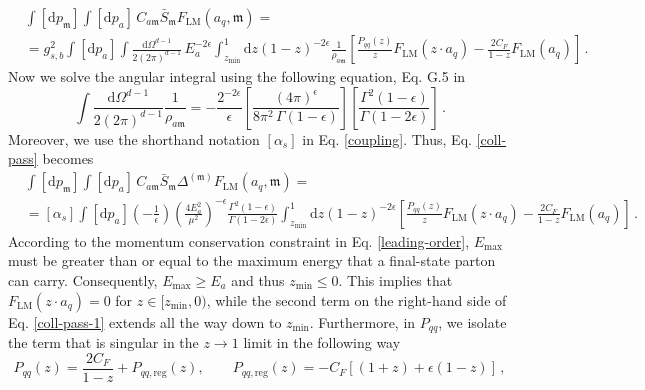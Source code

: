 \documentclass[a4paper, 12pt]{book}
\newcommand{\um}{\mathfrak{m}}
\begin{document}
\begin{equation}
  \begin{split}
  & \int [\mathrm{d}p_\um]\int[\mathrm{d}p_a] \, C_{a\um} \bar{S}_\um F_{\mathrm{LM}} (a_q, \um) = \\
  & = g^2_{s,b} \int[\mathrm{d}p_a] \int \frac{\mathrm{d}\Omega ^{d-1}}{2 (2\pi)^{d-1}} \, E_a^{-2\epsilon} \int_{z_{\mathrm{min}}}^{1} \mathrm{d}z (1-z)^{-2\epsilon} \frac{1}{ \rho_{a \um}} \left[\frac{P_{qq}(z)}{z} F_{\mathrm{LM}}(z \cdot a_q) - \frac{2 C_F}{1-z}F_{\mathrm{LM}} (a_q) \right] \, .
  \label{coll-pass}
  \end{split}
\end{equation}
Now we solve the angular integral using the following equation, Eq. G.5 in \cite{Asteriadis:1910}
\begin{equation}
  \int \frac{\mathrm{d}\Omega ^{d-1}}{2 (2\pi)^{d-1}} \frac{1}{\rho_{a \um}}= -\frac{2^{-2\epsilon}}{\epsilon} \left[ \frac{(4\pi)^{\epsilon}}{8\pi^2 \, \Gamma(1-\epsilon)}\right] \left[\frac{\Gamma^2(1-\epsilon)}{\Gamma(1-2\epsilon)} \right] \, .
\end{equation}
Moreover, we use the shorthand notation $[\alpha_s]$ in Eq. \ref{coupling}. Thus, Eq. \ref{coll-pass} becomes
\begin{equation}
  \begin{split}
  & \int [\mathrm{d}p_\um]\int[\mathrm{d}p_a] \, C_{a\um} \bar{S}_\um \Delta^{(\um)} F_{\mathrm{LM}} (a_q, \um) = \\
  & = [\alpha_s] \int[\mathrm{d}p_a] \left(-\frac{1}{\epsilon}\right) \left(\frac{4E_a^2}{\mu^2}\right)^{-\epsilon} \frac{\Gamma^2(1-\epsilon)}{\Gamma(1-2\epsilon)} \int_{z_{\mathrm{min}}}^{1} \mathrm{d}z (1-z)^{-2\epsilon} \left[ \frac{P_{qq}(z)}{z} F_{\mathrm{LM}}(z \cdot a_q) - \frac{2 C_F}{1-z}F_{\mathrm{LM}} (a_q) \right] \,.
  \label{coll-pass-1}
  \end{split}
\end{equation}
According to the momentum conservation constraint in Eq. \ref{leading-order}, $E_{\max}$ must be greater than or equal to the maximum energy that a final-state parton can carry. Consequently, $E_{\max} \geq E_a$ and thus $z_{\mathrm{min}} \leq 0$. This implies that $F_{\mathrm{LM}}(z \cdot a_q) = 0$ for $z \in \big[z_{\mathrm{min}}, 0 \big)$,  while the second term on the right-hand side of Eq. \ref{coll-pass-1} extends all the way down to $z_{\mathrm{min}}$. Furthermore, in $P_{qq}$, we isolate the term that is singular in the $z \to 1$ limit in the following way
\begin{equation}
  P_{qq}(z) = \frac{2 C_F}{1-z} + P_{qq,\mathrm{reg}} (z), \qquad P_{qq,\mathrm{reg}} (z) = - C_F [(1+z)+\epsilon(1-z)] \, ,
\end{equation}
\end{document}
